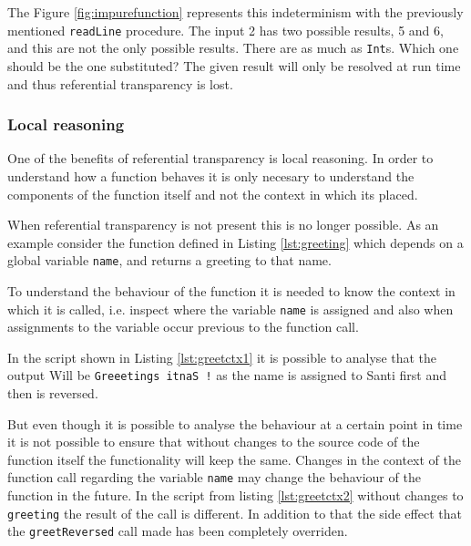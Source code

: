 \documentclass[../main.tex]{subfiles}
\begin{document}
The Figure \ref{fig:impurefunction} represents this indeterminism with the
previously mentioned \texttt{readLine} procedure. The input 2
has two possible results, 5 and 6, and this are not the only possible results.
There are as much as \texttt{Int}s. Which one should be the one substituted? The
given result will only be resolved at run time and thus referential transparency
is lost.

\subsubsection{Local reasoning} One of the benefits of referential transparency
is local reasoning. In order to understand how a function behaves it is only
necesary to understand the components of the function itself and not the context
in which its placed.

When referential transparency is not present this is no longer possible. As an
example consider the function defined in Listing \ref{lst:greeting} which
depends on a global variable \texttt{name}, and returns a greeting to that name.



To understand the behaviour of the function it is needed to know the context in
which it is called, i.e. inspect where the variable \texttt{name} is assigned
and also when assignments to the variable occur previous to the function call.

In the script shown in Listing \ref{lst:greetctx1} it is possible to analyse
that the output Will be \texttt{Greeetings itnaS !} as the name is assigned
to Santi first and then is reversed.



But even though it is possible to analyse the behaviour at a certain point in
time it is not possible to ensure that without changes to the source code of the
function itself the functionality will keep the same. Changes in the context
of the function call regarding the variable \texttt{name} may change the behaviour of
the function in the future. In the script from listing \ref{lst:greetctx2}
without changes to \texttt{greeting} the result of the call is different. In
addition to that the side effect that the \texttt{greetReversed} call made has
been completely overriden.
\end{document}
